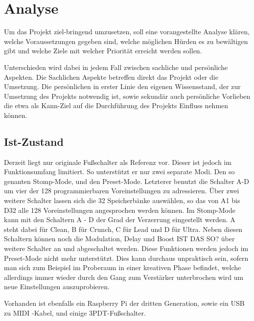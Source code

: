 \chapter{Analyse}



Um das Projekt ziel-bringend umzusetzen, soll eine vorangestellte Analyse klären, welche Voraussetzungen gegeben sind, welche möglichen Hürden es zu bewältigen gibt und welche Ziele mit welcher Priorität erreicht werden sollen.

Unterschieden wird dabei in jedem Fall zwischen sachliche und persönliche Aspekten. Die Sachlichen Aspekte betreffen direkt das Projekt oder die Umsetzung. Die persönlichen in erster Linie den eigenen Wissensstand, der zur Umsetzung des Projekts notwendig ist, sowie sekundär auch persönliche Vorlieben die etwa als Kann-Ziel auf die Durchführung des Projekts Einfluss nehmen können. 



\section{Ist-Zustand}


Derzeit liegt nur originale Fußschalter als Referenz vor. Dieser ist jedoch im Funktionsumfang limitiert. So unterstützt er nur zwei separate Modi. Den so genanten Stomp-Mode, und den Preset-Mode. Letzterer benutzt die Schalter A-D um vier der 128 programmierbaren Voreinstellungen zu adressieren. Über zwei weitere Schalter lassen sich die 32 Speicherbänke auswählen, so das von A1 bis D32 alle 128 Voreinstellungen angesprochen werden können. Im Stomp-Mode kann mit den Schaltern A - D der Grad der Verzerrung eingestellt werden. A steht dabei für Clean, B für Crunch, C für Lead und D für Ultra. Neben diesen Schaltern können noch die Modulation, Delay und Boost {\LARGE IST DAS SO?} über weitere Schalter an und abgeschaltet werden. Diese Funktionen werden jedoch im Preset-Mode nicht mehr unterstützt. Dies kann durchaus unpraktisch sein, sofern man sich zum Beispiel im Proberaum in einer kreativen Phase befindet, welche allerdings immer wieder durch den Gang zum Verstärker unterbrochen wird um neue Einstellungen auszuprobieren.   

Vorhanden ist ebenfalls ein Raspberry Pi der dritten Generation, sowie ein USB zu MIDI -Kabel, und einige 3PDT-Fußschalter.
	
